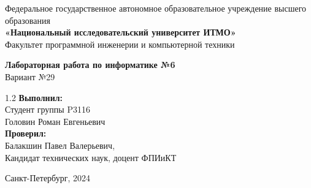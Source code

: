 \thispagestyle{empty}

\begin{center}
    {\small Федеральное государственное автономное образовательное учреждение высшего образования} \\
    \textbf{«Национальный исследовательский университет ИТМО»} \\
    \vspace{0.5cm}
    Факультет программной инженерии и компьютерной техники
    
    \vfill
    
    {\large \textbf{Лабораторная работа по информатике №6}} \\
    \vspace{0.3cm}
    {\large Вариант №29}
    
    \vfill
    
    \begin{flushright}
        \begin{minipage}{0.45\textwidth}
            \begin{spacing}{1.2}
                \textbf{Выполнил:} \\
                Студент группы P3116 \\
                Головин Роман Евгеньевич \\
                \textbf{Проверил:} \\
                Балакшин Павел Валерьевич, \\
                Кандидат технических наук, доцент ФПИиКТ
            \end{spacing}
        \end{minipage}
    \end{flushright}
    
    \vfill
    
    Санкт-Петербург, 2024
\end{center}